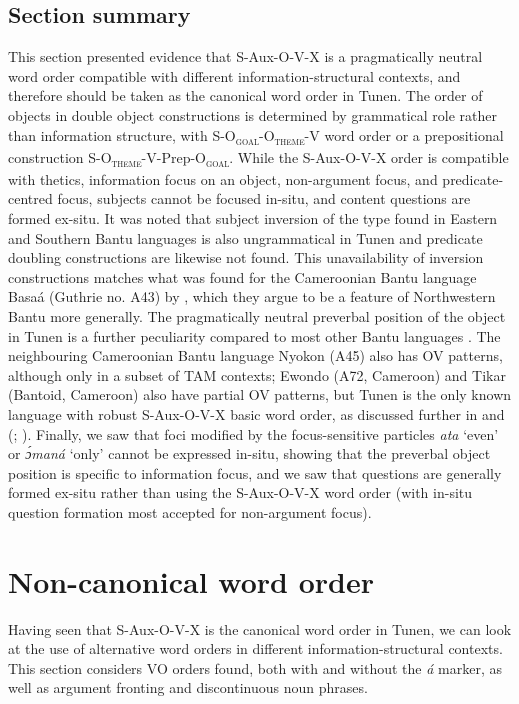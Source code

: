 \documentclass[output=paper,colorlinks,citecolor=brown
]{langscibook}
\begin{document}
\subsection{Section summary}
This section presented evidence that S-Aux-O-V-X is a pragmatically neutral word order compatible with different information-structural contexts, and therefore should be taken as the canonical word order in Tunen. The order of objects in double object constructions is determined by grammatical role rather than information structure, with S-O\textsubscript{\textsc{goal}}-O\textsubscript{\textsc{theme}}-V word order or a prepositional construction S-O\textsubscript{\textsc{theme}}-V-Prep-O\textsubscript{\textsc{goal}}. While the S-Aux-O-V-X order is compatible with thetics, information focus on an object, non-argument focus, and predicate-centred focus, subjects cannot be focused in-situ, and content questions are formed ex-situ. It was noted that subject inversion of the type found in Eastern and Southern Bantu languages is also ungrammatical in Tunen and predicate doubling constructions are likewise not found. This unavailability of inversion constructions matches what was found for the Cameroonian Bantu language Basaá (Guthrie no. A43) by \citet{HamlaouiMakasso2015}, which they argue to be a feature of Northwestern Bantu more generally. The pragmatically neutral preverbal position of the object in Tunen is a further peculiarity compared to most other Bantu languages \citep{Bearth2003, Mous1997, Mous2003}. The neighbouring Cameroonian Bantu language Nyokon (A45) also has OV patterns, although only in a subset of TAM contexts; Ewondo (A72, Cameroon) and Tikar (Bantoid, Cameroon) also have partial OV patterns, but Tunen is the only known language with robust S-Aux-O-V-X basic word order, as discussed further in  \citet{Mous1997, Mous2005, Mous2014} and (\citealt{Kerr2024}; \citeyear[Chapter 6]{KerrFut}). Finally, we saw that foci modified by the focus-sensitive particles \textit{ata} `even' or \textit{ɔ́maná} `only' cannot be expressed in-situ, showing that the preverbal object position is specific to information focus, and we saw that questions are generally formed ex-situ rather than using the S-Aux-O-V-X word order (with in-situ question formation most accepted for non-argument focus).

\section{Non-canonical word order}\label{secnoncanonwordorder}
Having seen that S-Aux-O-V-X is the canonical word order in Tunen, we can look at the use of alternative word orders in different information-structural contexts. This section considers VO orders found, both with and without the \textit{á} marker, as well as argument fronting and discontinuous noun phrases.
\end{document}

